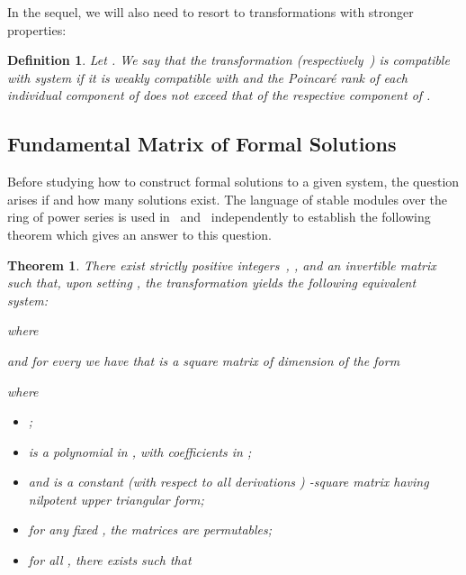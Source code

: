 \documentclass[final,1p,times,number,amsthm]{elsart}
\newtheorem{theorem}[lemma]{Theorem}
\newtheorem{definition}[lemma]{Definition}
\begin{document}
In the sequel, we will also need to resort to transformations with stronger
properties:
 \begin{definition}
\label{compatible}
Let . We say that the transformation 
(respectively~) is \textit{compatible} with system  if it is weakly
compatible with  and the Poincar\'{e} rank of each individual component of
 does not exceed that of the respective component of .
\end{definition}
\subsection{Fundamental Matrix of Formal Solutions}
Before studying how to construct formal solutions to a given system, the
question arises if and how many solutions exist. The language of stable modules
over the ring of power series is used in~\cite[Theorem 1]{key53} and~\cite[Main
Theorem]{key4} independently to establish the following theorem which gives an
answer to this question.

\begin{theorem}
  \label{gerardexistence}
  There exist strictly positive integers~, , and an
  invertible matrix  such that, upon setting
  , the transformation  yields the following
  equivalent system:
  
 where
 
 and for every  we have that
  is a square matrix of dimension  of the
 form
  
where
\begin{itemize}
\item ;
\item
   is a polynomial in , with coefficients in
  ;
\item  and  is a constant
  (with respect to all derivations ) -square
  matrix having nilpotent upper triangular form;
\item for any fixed , the matrices
   are permutables;
\item for all , there exists
   such that
 
\end{itemize}
\end{theorem}
\end{document}
